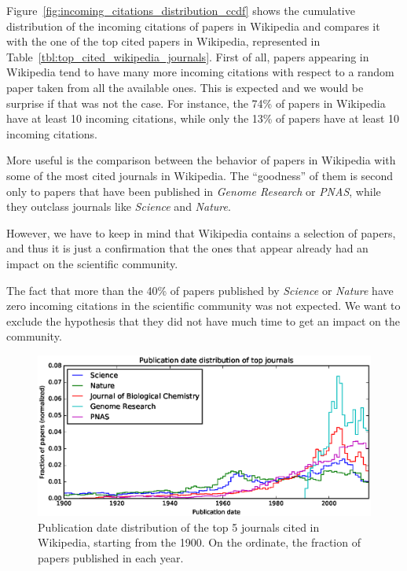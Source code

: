 Figure~\ref{fig:incoming_citations_distribution_ccdf} shows the cumulative distribution of the incoming citations of papers in Wikipedia and compares it with the one of the top cited papers in Wikipedia, represented in Table~\ref{tbl:top_cited_wikipedia_journals}.
First of all, papers appearing in Wikipedia tend to have many more incoming citations with respect to a random paper taken from all the available ones.
This is expected and we would be surprise if that was not the case.
For instance, the 74\% of papers in Wikipedia have at least 10 incoming citations, while only the 13\% of papers have at least 10 incoming citations.

More useful is the comparison between the behavior of papers in Wikipedia with some of the most cited journals in Wikipedia.
The ``goodness'' of them is second only to papers that have been published in \emph{Genome Research} or \emph{PNAS}, while they outclass journals like \emph{Science} and \emph{Nature}.

However, we have to keep in mind that Wikipedia contains a selection of papers, and thus it is just a confirmation that the ones that appear already had an impact on the scientific community.

The fact that more than the 40\% of papers published by \emph{Science} or \emph{Nature} have zero incoming citations in the scientific community was not expected.
We want to exclude the hypothesis that they did not have much time to get an impact on the community.

\begin{figure}[h]
\centering
\includegraphics[keepaspectratio=true, width=\textwidth]{assets/publication_date_distribution_journals}
\caption{Publication date distribution of the top 5 journals cited in Wikipedia, starting from the 1900.
On the ordinate, the fraction of papers published in each year.}
\label{fig:publication_date_distribution_journals}
\end{figure}

